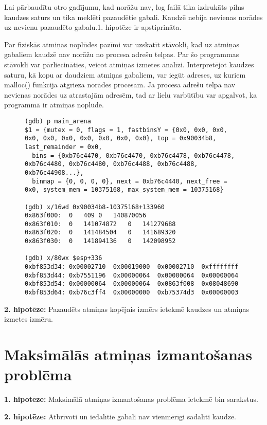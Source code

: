 Lai pārbaudītu otro gadījumu, kad norāžu nav, log failā tika izdrukāts pilns kaudzes saturs un tika meklēti pazaudētie gabali.
Kaudzē nebija nevienas norādes uz nevienu pazaudēto gabalu.1. hipotēze ir apstiprināta.

Par fiziskās atmiņas noplūdes pazīmi var uzskatīt stāvokli, kad uz atmiņas gabaliem kaudzē nav norāžu no procesa adrešu telpas.
Par šo programmas stāvokli var pārliecināties, veicot atmiņas izmetes analīzi.
Interpretējot kaudzes saturu, kā kopu ar daudziem atmiņas gabaliem, var iegūt adreses, uz kuriem malloc() funkcija atgrieza norādes procesam.
Ja procesa adrešu telpā nav nevienas norādes uz atrastajām adresēm, tad ar lielu varbūtību var apgalvot, ka programmā ir atmiņas noplūde.

\begin{figure}[h]
\begin{lstlisting}[style=customgdb]
(gdb) p main_arena
$1 = {mutex = 0, flags = 1, fastbinsY = {0x0, 0x0, 0x0, 0x0, 0x0, 0x0, 0x0, 0x0, 0x0, 0x0}, top = 0x90034b8, last_remainder = 0x0, 
  bins = {0xb76c4470, 0xb76c4470, 0xb76c4478, 0xb76c4478, 0xb76c4480, 0xb76c4480, 0xb76c4488, 0xb76c4488, 0xb76c44908...}, 
  binmap = {0, 0, 0, 0}, next = 0xb76c4440, next_free = 0x0, system_mem = 10375168, max_system_mem = 10375168}
  
(gdb) x/16wd 0x90034b8-10375168+133960
0x863f000:	0	409	0	140870056
0x863f010:	0	141074872	0	141279688
0x863f020:	0	141484504	0	141689320
0x863f030:	0	141894136	0	142098952

(gdb) x/80wx $esp+336
0xbf853d34:	0x00002710	0x00019000	0x00002710	0xffffffff
0xbf853d44:	0xb7551196	0x00000064	0x00000064	0x00000064
0xbf853d54:	0x00000064	0x00000064	0x0863f008	0x08048690
0xbf853d64:	0xb76c3ff4	0x00000000	0xb75374d3	0x00000003
\end{lstlisting}
\caption{\textbf{\fontsize{11}{12}\selectfont {Norādes meklēšana uz arr[ ] masīvu}}}
\end{figure}


\textbf{2. hipotēze:} Pazaudēts atmiņas kopējais izmērs ietekmē kaudzes un atmiņas izmetes izmēru.
\section{Maksimālās atmiņas izmantošanas problēma}


\textbf{1. hipotēze:} Maksimālā atmiņas izmantošanas problēma ietekmē bin sarakstus.

\textbf{2. hipotēze:} Atbrīvoti un iedalītie gabali nav vienmērīgi sadalīti kaudzē.

